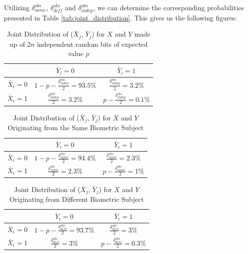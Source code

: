 Utilizing \(\delta_{same}^{obs}\), \(\delta_{diff}^{obs}\) and \(\delta_{indep}^{obs}\), we can determine the corresponding probabilities presented in Table \ref{tab:joint_distribution}. This gives us the following figures:

\begin{table}[H]
    \centering
    \renewcommand{\arraystretch}{1.5}
    \begin{tabular}{|c|c|c|}
        \hline
        & $\bar{Y}_i = 0$ & $\bar{Y}_i = 1$\\
        \hline
        $\bar{X}_i = 0$ & $1 - p - \frac{\delta_{indep}^{obs}}{2} = 93.5\% $ & $\frac{\delta_{indep}^{obs}}{2} = 3.2\%$\\
        \hline
        $\bar{X}_i = 1$ & $\frac{\delta_{indep}^{obs}}{2} = 3.2\% $ & $p - \frac{\delta_{indep}^{obs}}{2} = 0.1\%$\\
        \hline
    \end{tabular}
    \caption{Joint Distribution of ($\bar{X}_j$, $\bar{Y}_j$) for \(X\) and \(Y\) made up of \(2n\) independent random bits of expected value \(p\)}
    \label{tab:joint_distribution_deltaindep}
\end{table}


\begin{table}[H]
    \centering
    \renewcommand{\arraystretch}{1.5}
    \begin{tabular}{|c|c|c|}
        \hline
        & $\bar{Y}_i = 0$ & $\bar{Y}_i = 1$\\
        \hline
        $\bar{X}_i = 0$ & $1 - p - \frac{\delta_{same}^{obs}}{2} = 94.4\% $ & $\frac{\delta_{same}^{obs}}{2} = 2.3\%$\\
        \hline
        $\bar{X}_i = 1$ & $\frac{\delta_{same}^{obs}}{2} = 2.3\%$ & $p - \frac{\delta_{same}^{obs}}{2} = 1\%$\\
        \hline
    \end{tabular}
    \caption{Joint Distribution of ($\bar{X}_j$, $\bar{Y}_j$) for \(X\) and \(Y\)  Originating from the Same Biometric Subject}
    \label{tab:joint_distribution_deltasame}
\end{table}

\begin{table}[H]
    \centering
    \renewcommand{\arraystretch}{1.5}
    \begin{tabular}{|c|c|c|}
        \hline
        & $\bar{Y}_i = 0$ & $\bar{Y}_i = 1$\\
        \hline
        $\bar{X}_i = 0$ & $1 - p - \frac{\delta_{diff}^{obs}}{2} = 93.7\% $ & $\frac{\delta_{diff}^{obs}}{2} = 3\%$\\
        \hline
        $\bar{X}_i = 1$ & $\frac{\delta_{diff}^{obs}}{2} = 3\%$ & $p - \frac{\delta_{diff}^{obs}}{2} = 0.3\%$\\
        \hline
    \end{tabular}
    \caption{Joint Distribution of ($\bar{X}_j$, $\bar{Y}_j$) for \(X\) and \(Y\) Originating from Different Biometric Subject}
    \label{tab:joint_distribution_deltadiff}
\end{table}








